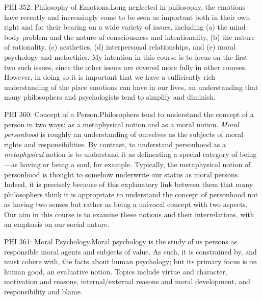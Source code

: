\documentclass[%
  11pt,%
]{article}
\begin{document}
\begin{htmlcourse}{PHI 352: Philosophy of Emotions.}{Long neglected in philosophy, the emotions have recently and increasingly come to be seen as important both in their own right and for their bearing on a wide variety of issues, including (a) the mind--body problem and the nature of consciousness and intentionality, (b) the nature of rationality, (c) aesthetics, (d) interpersonal relationships, and (e) moral psychology and metaethics. My intention in this course is to focus on the first two such issues, since the other issues are covered more fully in other courses. However, in doing so it is important that we have a sufficiently rich understanding of the place emotions can have in our lives, an understanding that many philosophers and psychologists tend to simplify and diminish.}\end{htmlcourse}

\begin{htmlcourse}{PHI 360: Concept of a Person.}{Philosophers tend to understand the concept of a person in two ways: as a metaphysical notion and as a moral notion. \emph{Moral personhood} is roughly an understanding of ourselves as the subjects of moral rights and responsibilities. By contrast, to understand personhood as a \emph{metaphysical} notion is to understand it as delineating a special category of being---as having or being a soul, for example. Typically, the metaphysical notion of personhood is thought to somehow underwrite our status as moral persons. Indeed, it is precisely because of this explanatory link between them that many philosophers think it is appropriate to understand the concept of personhood not as having two senses but rather as being a univocal concept with two aspects. Our aim in this course is to examine these notions and their interrelations, with an emphasis on our social nature.}\end{htmlcourse}

\begin{htmlcourse}{PHI 361: Moral Psychology.}{Moral psychology is the study of us persons as responsible moral agents and subjects of value. As such, it is constrained by, and must cohere with, the facts about human psychology; but its primary focus is on human good, an evaluative notion. Topics include virtue and character, motivation and reasons, internal/external reasons and moral development, and responsibility and blame.}\end{htmlcourse}
\end{document}
